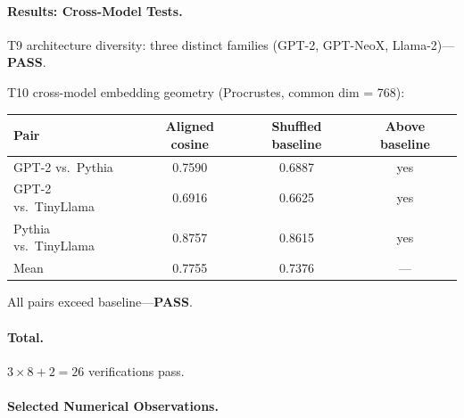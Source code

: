 \documentclass[a4paper,twocolumn,11pt]{article}
\begin{document}
\paragraph{Results: Cross-Model Tests.}

T9 architecture diversity: three distinct families (GPT-2, GPT-NeoX, Llama-2)---\textbf{PASS}.

T10 cross-model embedding geometry (Procrustes, common dim = 768):

\begin{center}
\begin{tabular}{@{}lccc@{}}
\toprule
Pair & Aligned cosine & Shuffled baseline & Above baseline \\
\midrule
GPT-2 vs.\ Pythia        & 0.7590 & 0.6887 & yes \\
GPT-2 vs.\ TinyLlama     & 0.6916 & 0.6625 & yes \\
Pythia vs.\ TinyLlama    & 0.8757 & 0.8615 & yes \\
\midrule
Mean                     & 0.7755 & 0.7376 & --- \\
\bottomrule
\end{tabular}
\end{center}

All pairs exceed baseline---\textbf{PASS}.

\paragraph{Total.}  $3 \times 8 + 2 = 26$ verifications pass.

\paragraph{Selected Numerical Observations.}
\end{document}
